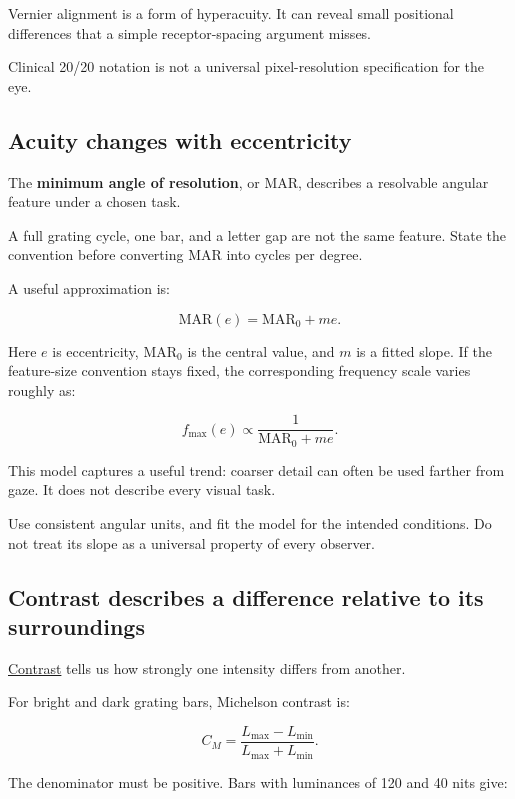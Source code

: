 Vernier alignment is a form of hyperacuity. It can reveal small positional differences that a simple receptor-spacing argument misses.

Clinical 20/20 notation is not a universal pixel-resolution specification for the eye.

\subsection{Acuity changes with eccentricity}\label{04-visual-computing-ii-ch043-acuity-changes-with-eccentricity}

The \textbf{minimum angle of resolution}, or MAR, describes a resolvable angular feature under a chosen task.

A full grating cycle, one bar, and a letter gap are not the same feature. State the convention before converting MAR into cycles per degree.

A useful approximation is:

\[
\mathrm{MAR}(e)=\mathrm{MAR}_0+me.
\]

Here \(e\) is eccentricity, \(\mathrm{MAR}_0\) is the central value, and \(m\) is a fitted slope. If the feature-size convention stays fixed, the corresponding frequency scale varies roughly as:

\[
f_{\max}(e)\propto\frac1{\mathrm{MAR}_0+me}.
\]

This model captures a useful trend: coarser detail can often be used farther from gaze. It does not describe every visual task.

Use consistent angular units, and fit the model for the intended conditions. Do not treat its slope as a universal property of every observer.

\subsection{Contrast describes a difference relative to its surroundings}\label{04-visual-computing-ii-ch043-contrast-describes-a-difference-relative-to-its-surroundings}

\hyperref[appendix-b3aa9e8e01ad]{Contrast} tells us how strongly one intensity differs from another.

For bright and dark grating bars, Michelson contrast is:

\[
C_M=\frac{L_{\max}-L_{\min}}{L_{\max}+L_{\min}}.
\]

The denominator must be positive. Bars with luminances of 120 and 40 nits give:

